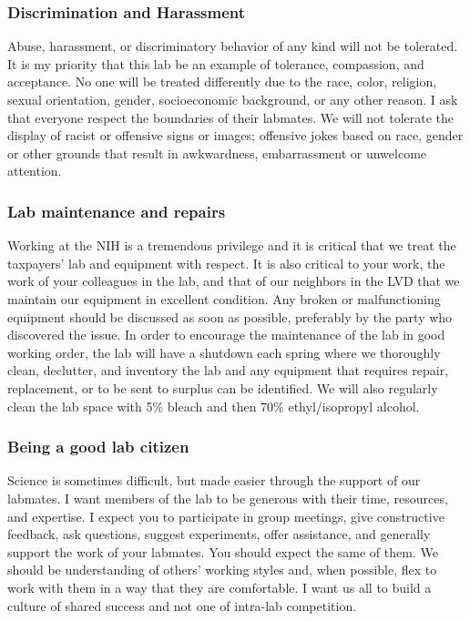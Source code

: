 \documentclass[10pt, letterpaper, twocolumn]{article} %
\begin{document}
\subsubsection{Discrimination and Harassment}
Abuse, harassment, or discriminatory behavior of any kind will not be tolerated. It is my priority that this lab be an example of tolerance, compassion, and acceptance. No one will be treated differently due to the race, color, religion, sexual orientation, gender, socioeconomic background, or any other reason. I ask that everyone respect the boundaries of their labmates. We will not tolerate the display of racist or offensive signs or images; offensive jokes based on race, gender or other grounds that result in awkwardness, embarrassment or unwelcome attention.  

\subsubsection{Lab maintenance and repairs}
Working at the NIH is a tremendous privilege and it is critical that we treat the taxpayers' lab and equipment with respect. It is also critical to your work, the work of your colleagues in the lab, and that of our neighbors in the LVD that we maintain our equipment in excellent condition. Any broken or malfunctioning equipment should be discussed as soon as possible, preferably by the party who discovered the issue.
In order to encourage the maintenance of the lab in good working order, the lab will have a shutdown each spring where we thoroughly clean, declutter, and inventory the lab and any equipment that requires repair, replacement, or to be sent to surplus can be identified. We will also regularly clean the lab space with 5\% bleach and then 70\% ethyl/isopropyl alcohol.

\subsubsection{Being a good lab citizen}
Science is sometimes difficult, but made easier through the support of our labmates. I want members of the lab to be generous with their time, resources, and expertise. I expect you to participate in group meetings, give constructive feedback, ask questions, suggest experiments, offer assistance, and generally support the work of your labmates. You should expect the same of them. We should be understanding of others' working styles and, when possible, flex to work with them in a way that they are comfortable. I want us all to build a culture of shared success and not one of intra-lab competition.
\end{document}
